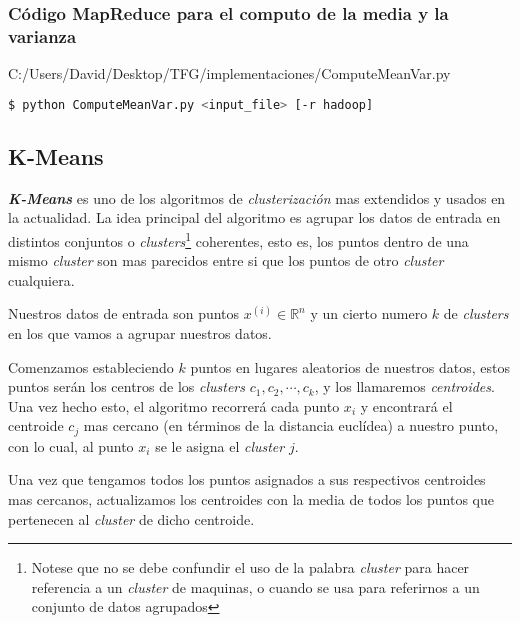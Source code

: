 \newpage  
  
\subsubsection*{Código MapReduce para el computo de la media y la varianza}
  

                {C:/Users/David/Desktop/TFG/implementaciones/ComputeMeanVar.py}

\begin{lstlisting}[language=bash, numbers=none]
$ python ComputeMeanVar.py <input_file> [-r hadoop]
\end{lstlisting}
  
\newpage

\subsection{K-Means}
\textbf{\textit{K-Means}} es uno de los algoritmos de \textit{clusterización} mas 
extendidos y usados en la actualidad. La idea principal del algoritmo es agrupar los datos de entrada 
en distintos conjuntos o \textit{clusters}\footnote{Notese que no se debe confundir el uso de la 
palabra \textit{cluster} para hacer referencia a un \textit{cluster} de maquinas, o cuando se usa 
para referirnos a un conjunto de datos agrupados} 
coherentes, esto es, los puntos dentro de una mismo \textit{cluster} son mas parecidos entre si 
que los puntos de otro \textit{cluster} cualquiera.
\newline

Nuestros datos de entrada son puntos $x^{(i)} \in \mathds{R}^n$ y un cierto numero $k$ de 
\textit{clusters} en los que vamos a agrupar nuestros datos.

Comenzamos estableciendo $k$ puntos en lugares aleatorios de nuestros datos, estos puntos serán los 
centros de los \textit{clusters} $c_1, c_2, \cdots, c_k$, y los llamaremos \textit{centroides}.
Una vez hecho esto, el algoritmo recorrerá cada punto $x_i$ y encontrará el centroide $c_j$ mas 
cercano (en términos de la distancia euclídea) a nuestro punto, con lo cual, al punto $x_i$ se le 
asigna el \textit{cluster} $j$.

Una vez que tengamos todos los puntos asignados a sus respectivos centroides mas cercanos, actualizamos 
los centroides con la media de todos los puntos que pertenecen al \textit{cluster} de dicho centroide.

